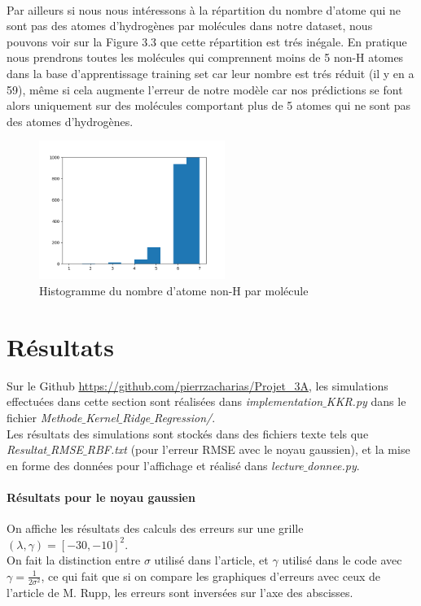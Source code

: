 \documentclass[a4paper,12pt,titlepage]{report}
\begin{document}
\paragraph{} 
Par ailleurs si nous nous intéressons à la répartition du nombre d'atome qui ne sont pas des atomes d'hydrogènes par molécules dans notre dataset, nous pouvons voir sur la Figure 3.3 que cette répartition est trés inégale. En pratique nous prendrons toutes les molécules qui comprennent moins de 5 non-H atomes dans la base d'apprentissage training set car leur nombre est trés réduit (il y en a 59), même si cela augmente l'erreur de notre modèle car nos prédictions se font alors uniquement sur des molécules comportant plus de 5 atomes qui ne sont pas des atomes d'hydrogènes.
\begin{figure}[!h]
\begin{center}
		\includegraphics[height = 4.5cm, keepaspectratio]{graphes/non_H_atom.png}
		\caption{Histogramme du nombre d'atome non-H par molécule}
		\end{center}
\end{figure}

\section{Résultats}
Sur le Github \url{https://github.com/pierrzacharias/Projet_3A}, les simulations effectuées dans cette section sont réalisées dans \textit{implementation{$\_$}KKR.py} dans le fichier \textit{Methode{$\_$}Kernel{$\_$}Ridge{$\_$}Regression/}. \\
Les résultats des simulations sont stockés dans des fichiers texte tels que \\
\textit{Resultat{$\_$}RMSE{$\_$}RBF.txt} (pour l'erreur RMSE avec le noyau gaussien), et la mise en forme des données pour l'affichage et réalisé dans  \textit{lecture{$\_$}donnee.py}.

\paragraph{Résultats pour le noyau gaussien}
On affiche les résultats des calculs des erreurs sur une grille $(\lambda,\gamma) = [-30,-10]^2$. \\
On fait la distinction entre $\sigma$ utilisé dans l'article, et $\gamma$ utilisé dans le code avec $\gamma = \frac{1}{2\sigma^2}$, ce qui fait que si on compare les graphiques d'erreurs avec ceux de l'article de M. Rupp, les erreurs sont inversées sur l'axe des abscisses.
\end{document}
